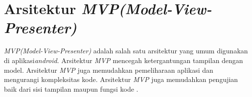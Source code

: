 \section{Arsitektur \textit{MVP(Model-View-Presenter)}}
\textit{MVP(Model-View-Presenter)} adalah salah satu arsitektur yang umum digunakan di aplikasi\newline \textit{android}. Arsitektur \textit{MVP} mencegah ketergantungan tampilan dengan model. Arsitektur \textit{MVP} juga memudahkan pemeliharaan aplikasi dan mengurangi kompleksitas kode. Arsitektur \textit{MVP} juga memudahkan pengujian baik dari sisi tampilan maupun fungsi kode \cite{arif:20:audit}.




		
			

